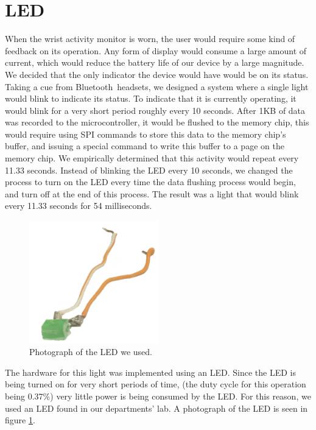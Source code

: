 \section{LED}
\label{Sec:LED}
When the wrist activity monitor is worn,
the user would require some kind of feedback on its operation.
Any form of display would consume a large amount of current,
which would reduce the battery life of our device by a large magnitude.
We decided that the only indicator the device would have would be on its status.
Taking a cue from Bluetooth\texttrademark ~headsets,
we designed a system where a single light would blink to indicate its status.
To indicate that it is currently operating, it would blink for a very short period roughly every 10 seconds.
After 1KB of data was recorded to the microcontroller, it would be flushed to the memory chip,
this would require using SPI commands to store this data to the memory chip's buffer,
and issuing a special command to write this buffer to a page on the memory chip.
We empirically determined that this activity would repeat every 11.33 seconds.
Instead of blinking the LED every 10 seconds, we changed the process to turn on the LED every time the data flushing process would begin,
and turn off at the end of this process.
The result was a light that would blink every 11.33 seconds for 54 milliseconds.
\begin{figure}
\begin{center}
\includegraphics[width=0.5\textwidth]{images/LEDPhoto.jpg}
\caption{Photograph of the LED we used.}
\label{Fig:LEDPHOTO}
\end{center}
\end{figure}
The hardware for this light was implemented using an LED.
Since the LED is being turned on for very short periods of time, 
(the duty cycle for this operation being 0.37\%) very little power is being consumed by the LED.
For this reason, we used an LED found in our departments' lab. A photograph of the LED is seen in figure \ref{Fig:LEDPHOTO}.

